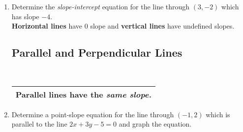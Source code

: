 \begin{enumerate}
\vspace{-.1in}
\item Determine the \emph{slope-intercept} equation for the line through $(3, -2)$ which has slope $-4$. \\[1in]



\noindent \textbf{Horizontal lines} have 0 slope and \textbf{vertical lines} have undefined slopes.\\[1in]


\subsection{Parallel and Perpendicular Lines} ~

\hspace{-.3in} \begin{tabular}{| l |  }
\hline Parallel lines have the \emph{same slope.} \\ \hline
\end{tabular} %

\vspace{-.1in}
\item Determine a point-slope equation for the line through $(-1,2)$ which is parallel to the line $2x + 3y - 5 = 0$ and graph the equation.





\end{enumerate}
